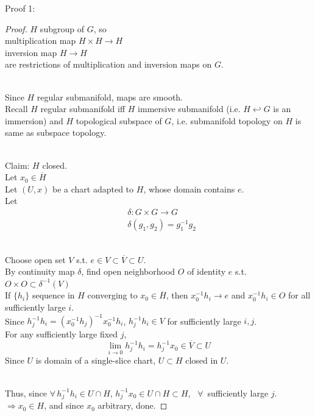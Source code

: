 \documentclass[10pt]{amsart}
\begin{document}
\begin{multicols*}{2}
Proof 1:

\begin{proof}
$H$ subgroup of $G$, so \\
multiplication map $H\times H \to H$ \\
inversion map $H\to H$ \\
are restrictions of multiplication and inversion maps on $G$.

\qquad \\
Since $H$ regular submanifold, maps are smooth. \\
Recall $H$ regular submanifold iff $H$ immersive submanifold (i.e. $H\hookleftarrow G$ is an immersion) and $H$ topological subspace of $G$, i.e. submanifold topology on $H$ is same as subspace topology.

\quad \\ 
Claim: $H$ closed. \\
Let $x_0 \in \overline{H}$ \\
Let $(U,x)$ be a chart adapted to $H$, whose domain contains $e$. \\
Let 
\[
\begin{aligned}
& \delta : G \times G \to G \\
& \delta (g_1, g_2)  = g_1^{-1} g_2
\end{aligned}
\]

\quad \\ 
Choose open set $V$ s.t. $e\in V \subset \overline{V} \subset U$. \\
By continuity map $\delta$, find open neighborhood $O$ of identity $e$ s.t. $O \times O \subset \delta^{-1}(V)$ \\
If $\lbrace h_i \rbrace$ sequence in $H$ converging to $x_0 \in \overline{H}$, then $x_0^{-1} h_i \to e$ and $x_0^{-1} h_i \in O$ for all sufficiently large $i$.  \\
Since $h_j^{-1} h_i = (x_0^{-1} h_j)^{-1} x_0^{-1} h_i$, $h_j^{-1} h_i \in V$ for sufficiently large $i,j$.  \\

For any sufficiently large fixed $j$, 
\[
\lim_{i\to 0} h_j^{-1} h_i = h_j^{-1} x_0 \in \overline{V} \subset U
\]
Since $U$ is domain of a single-slice chart, $U\subset H$ closed in $U$.

\quad \\
Thus, since $\forall \, h_j^{-1} h_i \in U \cap H$, $h_j^{-1} x_0 \in U \cap H \subset H$, \quad \, $\forall \, $ sufficiently large $j$.  \\
$\Longrightarrow x_0 \in H$, and since $x_0$ arbitrary, done.
	

\end{proof}
\end{multicols*}
\end{document}
